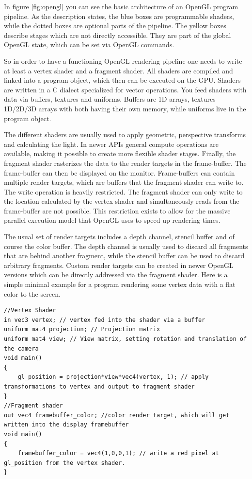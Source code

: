 In figure \ref{fig:opengl} you can see the basic architecture of an OpenGL program pipeline.
As the description states, the blue boxes are programmable shaders, while the dotted boxes are optional parts of the pipeline.
The yellow boxes describe stages which are not directly accessible. They are part of the global OpenGL state, which can be set via OpenGL commands.

So in order to have a functioning OpenGL rendering pipeline one needs to write at least a vertex shader and a fragment shader.
All shaders are compiled and linked into a program object, which then can be executed on the \ac{GPU}.
Shaders are written in a C dialect specialized for vector operations.
You feed shaders with data via buffers, textures and uniforms. Buffers are 1D arrays, textures 1D/2D/3D arrays with both having their own memory, while uniforms live in the program object.

The different shaders are usually used to apply geometric, perspective transforms and calculating the light.
In newer APIs general compute operations are available, making it possible to create more flexible shader stages.
Finally, the fragment shader rasterizes the data to the render targets in the frame-buffer.
The frame-buffer can then be displayed on the monitor.
Frame-buffers can contain multiple render targets, which are buffers that the fragment shader can write to.
The write operation is heavily restricted. The fragment shader can only write to the location calculated by the vertex shader and simultaneously reads from the frame-buffer are not possible. 
This restriction exists to allow for the massive parallel execution model that OpenGL uses to speed up rendering times.

The usual set of render targets includes a depth channel, stencil buffer and of course the color buffer.
The depth channel is usually used to discard all fragments that are behind another fragment, while the stencil buffer can be used to discard arbitrary fragments. Custom render targets can be created in newer OpenGL versions which can be directly addressed via the fragment shader.
Here is a simple minimal example for a program rendering some vertex data with a flat color to the screen.

\begin{lstlisting}
//Vertex Shader
in vec3 vertex; // vertex fed into the shader via a buffer
uniform mat4 projection; // Projection matrix
uniform mat4 view; // View matrix, setting rotation and translation of the camera
void main()
{
    gl_position = projection*view*vec4(vertex, 1); // apply transformations to vertex and output to fragment shader
}
//Fragment shader
out vec4 framebuffer_color; //color render target, which will get written into the display framebuffer
void main()
{
    framebuffer_color = vec4(1,0,0,1); // write a red pixel at gl_position from the vertex shader.
}
\end{lstlisting}

